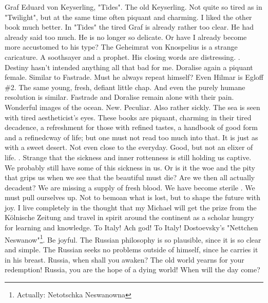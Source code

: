 
Graf Eduard von Keyserling, "Tides". The old Keyserling. Not quite so tired as in "Twilight", but at the same time often piquant and charming. I liked the other book much better. In "Tides" the tired Graf is already rather too clear. He had already said too much. He is no longer so delicate. Or have I already become more accustomed to his type? The Geheimrat von Knospelius is a strange caricature. A soothsayer and a prophet. His closing words are distressing. . Destiny hasn't intended anything all that bad for me. Doralise again a piquant female. Similar to Fastrade. Must he always repeat himself? Even Hilmar is Egloff \#2. The same young, fresh, defiant little chap. And even the purely humane resolution is similar. Fastrade and Doralise remain alone with their pain. Wonderful images of the ocean. New. Peculiar. Also rather sickly. The sea is seen with tired aestheticist's eyes. These books are piquant, charming in their tired decadence, a refreshment for those with refined tastes, a handbook of good form and a refinedcway of life; but one must not read too much into that. It is just as with a sweet desert. Not even close to the everyday. Good, but not an elixer of life. . Strange that the sickness and inner rottenness is still holding us captive. We probably still have some of this sickness in us. Or is it the woe and the pity that grips us when we see that the beautiful must die? Are we then all actually decadent? We are missing a supply of fresh blood. We have become sterile . We must pull ourselves up. Not to bemoan what is lost, but to shape the future with joy. I live completely in the thought that my Michael will get the prize from the Kölnische Zeitung and travel in spirit around the continent as a scholar hungry for learning and knowledge. To Italy! Ach god! To Italy! Dostoevsky's "Nettchen Neswanow"\footnote{Actually: Netotschka Neswanowna}. Be joyful. The Russian philosophy is so plausible, since it is so clear and simple. The Russian seeks no problems outside of himself, since he carries it in his breast. Russia, when shall you awaken? The old world yearns for your redemption! Russia, you are the hope of a dying world! When will the day come?